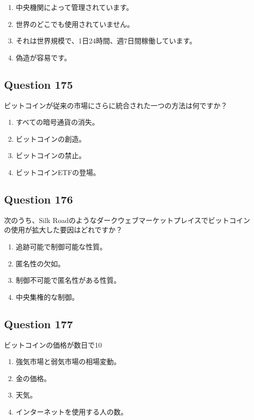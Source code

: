 \documentclass[12pt,a4paper]{article}
\begin{document}
\begin{enumerate}[label=\Alph*., leftmargin=*]
\item 中央機関によって管理されています。
\item 世界のどこでも使用されていません。
\item それは世界規模で、1日24時間、週7日間稼働しています。
\item 偽造が容易です。
\end{enumerate}

\bigskip


\subsection*{Question 175}
ビットコインが従来の市場にさらに統合された一つの方法は何ですか？

\begin{enumerate}[label=\Alph*., leftmargin=*]
\item すべての暗号通貨の消失。
\item ビットコインの創造。
\item ビットコインの禁止。
\item ビットコインETFの登場。
\end{enumerate}

\bigskip


\subsection*{Question 176}
次のうち、Silk Roadのようなダークウェブマーケットプレイスでビットコインの使用が拡大した要因はどれですか？

\begin{enumerate}[label=\Alph*., leftmargin=*]
\item 追跡可能で制御可能な性質。
\item 匿名性の欠如。
\item 制御不可能で匿名性がある性質。
\item 中央集権的な制御。
\end{enumerate}

\bigskip


\subsection*{Question 177}
ビットコインの価格が数日で10%

\begin{enumerate}[label=\Alph*., leftmargin=*]
\item 強気市場と弱気市場の相場変動。
\item 金の価格。
\item 天気。
\item インターネットを使用する人の数。
\end{enumerate}
\end{document}
